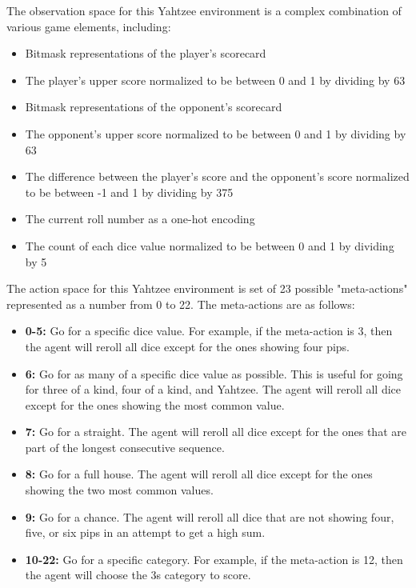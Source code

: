 \documentclass[12pt]{article}
\begin{document}
\noindent
The observation space for this Yahtzee environment is a complex combination of various game elements, including:

\begin{itemize}
    \item Bitmask representations of the player's scorecard
    \item The player's upper score normalized to be between 0 and 1 by dividing by 63
    \item Bitmask representations of the opponent's scorecard
    \item The opponent's upper score normalized to be between 0 and 1 by dividing by 63
    \item The difference between the player's score and the opponent's score normalized to be between -1 and 1 by dividing by 375
    \item The current roll number as a one-hot encoding
    \item The count of each dice value normalized to be between 0 and 1 by dividing by 5
\end{itemize}

\noindent
The action space for this Yahtzee environment is set of 23 possible "meta-actions" represented as a number from 0 to 22. The meta-actions are as follows:

\begin{itemize}
    \item \textbf{0-5:} Go for a specific dice value. For example, if the meta-action is 3, then the agent will reroll all dice except for the ones showing four pips.
    \item \textbf{6:} Go for as many of a specific dice value as possible. This is useful for going for three of a kind, four of a kind, and Yahtzee. The agent will reroll all dice except for the ones showing the most common value.
    \item \textbf{7:} Go for a straight. The agent will reroll all dice except for the ones that are part of the longest consecutive sequence.
    \item \textbf{8:} Go for a full house. The agent will reroll all dice except for the ones showing the two most common values.
    \item \textbf{9:} Go for a chance. The agent will reroll all dice that are not showing four, five, or six pips in an attempt to get a high sum.
    \item \textbf{10-22:} Go for a specific category. For example, if the meta-action is 12, then the agent will choose the 3s category to score.
\end{itemize}
\end{document}
